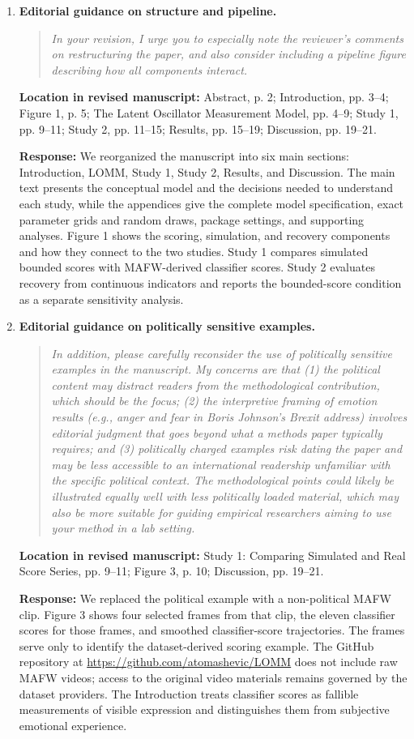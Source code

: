 \documentclass[11pt]{article}
\newenvironment{reviewquote}{\begin{quote}\small\itshape}{\end{quote}}
\newcommand{\point}[1]{\textbf{#1.}}
\newcommand{\location}[1]{\textbf{Location in revised manuscript:} #1\par}
\newcommand{\response}{\textbf{Response:} }
\begin{document}
\begin{enumerate}
  \item \point{Editorial guidance on structure and pipeline}
  \begin{reviewquote}
  In your revision, I urge you to especially note the reviewer's comments on restructuring the paper, and also consider including a pipeline figure describing how all components interact.
  \end{reviewquote}
  \location{Abstract, p. 2; Introduction, pp. 3--4; Figure 1, p. 5; The Latent Oscillator Measurement Model, pp. 4--9; Study 1, pp. 9--11; Study 2, pp. 11--15; Results, pp. 15--19; Discussion, pp. 19--21.}
  \response We reorganized the manuscript into six main sections: Introduction, LOMM, Study 1, Study 2, Results, and Discussion. The main text presents the conceptual model and the decisions needed to understand each study, while the appendices give the complete model specification, exact parameter grids and random draws, package settings, and supporting analyses. Figure 1 shows the scoring, simulation, and recovery components and how they connect to the two studies. Study 1 compares simulated bounded scores with MAFW-derived classifier scores. Study 2 evaluates recovery from continuous indicators and reports the bounded-score condition as a separate sensitivity analysis.

  \item \point{Editorial guidance on politically sensitive examples}
  \begin{reviewquote}
  In addition, please carefully reconsider the use of politically sensitive examples in the manuscript. My concerns are that (1) the political content may distract readers from the methodological contribution, which should be the focus; (2) the interpretive framing of emotion results (e.g., anger and fear in Boris Johnson's Brexit address) involves editorial judgment that goes beyond what a methods paper typically requires; and (3) politically charged examples risk dating the paper and may be less accessible to an international readership unfamiliar with the specific political context. The methodological points could likely be illustrated equally well with less politically loaded material, which may also be more suitable for guiding empirical researchers aiming to use your method in a lab setting.
  \end{reviewquote}
  \location{Study 1: Comparing Simulated and Real Score Series, pp. 9--11; Figure 3, p. 10; Discussion, pp. 19--21.}
  \response We replaced the political example with a non-political MAFW clip. Figure 3 shows four selected frames from that clip, the eleven classifier scores for those frames, and smoothed classifier-score trajectories. The frames serve only to identify the dataset-derived scoring example. The GitHub repository at \url{https://github.com/atomashevic/LOMM} does not include raw MAFW videos; access to the original video materials remains governed by the dataset providers. The Introduction treats classifier scores as fallible measurements of visible expression and distinguishes them from subjective emotional experience.
\end{enumerate}
\end{document}
